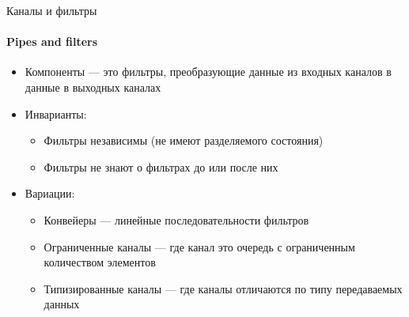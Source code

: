 \documentclass{../../slides-style}
\begin{document}
    \begin{frame}{Каналы и фильтры}
        \framesubtitle{Pipes and filters}
        \begin{itemize}
            \item Компоненты --- это фильтры, преобразующие данные из входных каналов в данные в выходных каналах
            \item Инварианты:
            \begin{itemize}
                \item Фильтры независимы (не имеют разделяемого состояния)
                \item Фильтры не знают о фильтрах до или после них
            \end{itemize}
            \item Вариации:
            \begin{itemize}
                \item Конвейеры --- линейные последовательности фильтров
                \item Ограниченные каналы --- где канал это очередь с ограниченным количеством элементов
                \item Типизированные каналы --- где каналы отличаются по типу передаваемых данных
            \end{itemize}
        \end{itemize}
    \end{frame}
\end{document}
